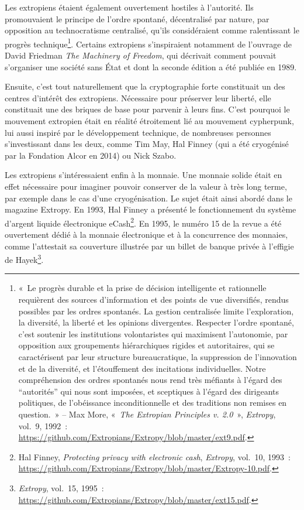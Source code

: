 \documentclass[
  a5paper,
  smalldemyvopaper,10pt,twoside,onecolumn,openright,extrafontsizes,hidelinks]{memoir}
\begin{document}
Les extropiens étaient également ouvertement hostiles à l'autorité. Ils
promouvaient le principe de l'ordre spontané, décentralisé par nature,
par opposition au technocratisme centralisé, qu'ils considéraient comme
ralentissant le progrès technique\footnote{«~Le progrès durable et la
  prise de décision intelligente et rationnelle requièrent des sources
  d'information et des points de vue diversifiés, rendus possibles par
  les ordres spontanés. La gestion centralisée limite l'exploration, la
  diversité, la liberté et les opinions divergentes. Respecter l'ordre
  spontané, c'est soutenir les institutions volontaristes qui maximisent
  l'autonomie, par opposition aux groupements hiérarchiques rigides et
  autoritaires, qui se caractérisent par leur structure bureaucratique,
  la suppression de l'innovation et de la diversité, et l'étouffement
  des incitations individuelles. Notre compréhension des ordres
  spontanés nous rend très méfiants à l'égard des ``autorités'' qui nous
  sont imposées, et sceptiques à l'égard des dirigeants politiques, de
  l'obéissance inconditionnelle et des traditions non remises en
  question.~» -- Max More, «~\emph{The Extropian Principles v. 2.0}~»,
  \emph{Extropy}, vol.~9, 1992~:
  \url{https://github.com/Extropians/Extropy/blob/master/ext9.pdf}.}.
Certains extropiens s'inspiraient notamment de l'ouvrage de David
Friedman \emph{The Machinery of Freedom}, qui décrivait comment pouvait
s'organiser une société sans État et dont la seconde édition a été
publiée en 1989.

Ensuite, c'est tout naturellement que la cryptographie forte constituait
un des centres d'intérêt des extropiens. Nécessaire pour préserver leur
liberté, elle constituait une des briques de base pour parvenir à leurs
fins. C'est pourquoi le mouvement extropien était en réalité étroitement
lié au mouvement cypherpunk, lui aussi inspiré par le développement
technique, de nombreuses personnes s'investissant dans les deux, comme
Tim May, Hal Finney (qui a été cryogénisé par la Fondation Alcor en
2014) ou Nick Szabo.

Les extropiens s'intéressaient enfin à la monnaie. Une monnaie solide
était en effet nécessaire pour imaginer pouvoir conserver de la valeur à
très long terme, par exemple dans le cas d'une cryogénisation. Le sujet
était ainsi abordé dans le magazine Extropy. En 1993, Hal Finney a
présenté le fonctionnement du système d'argent liquide électronique
eCash\footnote{Hal Finney, \emph{Protecting privacy with electronic
  cash}, \emph{Extropy}, vol.~10, 1993~:
  \url{https://github.com/Extropians/Extropy/blob/master/Extropy-10.pdf}.}.
En 1995, le numéro 15 de la revue a été ouvertement dédié à la monnaie
électronique et à la concurrence des monnaies, comme l'attestait sa
couverture illustrée par un billet de banque privée à l'effigie de
Hayek\footnote{\emph{Extropy}, vol.~15, 1995~:
  \url{https://github.com/Extropians/Extropy/blob/master/ext15.pdf}.}.
\end{document}
